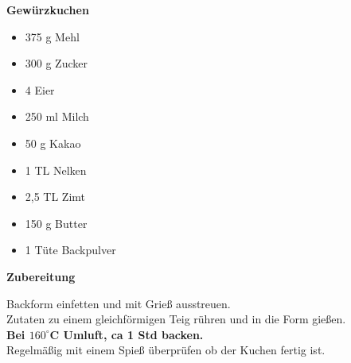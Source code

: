 
\parindent0pt	

\pagestyle{empty}


\textbf{{\LARGE Gewürzkuchen}}%


\hrulefill
\vspace*{\fill}
\begin{multicols}{2}	


\begin{itemize}
\item 375 g Mehl
\item 300 g Zucker
\item 4 Eier
\item 250 ml Milch
\item 50 g Kakao
\item 1 TL Nelken
\item 2,5 TL Zimt
\item 150 g Butter
\item 1 Tüte Backpulver
\end{itemize}

\end{multicols}
\vfill
\newpage
\textbf{{\LARGE Zubereitung}}%

\hrulefill

\vspace*{\fill}
\begin{multicols}{2}


Backform einfetten und mit Grieß ausstreuen.\\
Zutaten zu einem gleichförmigen Teig rühren und in die Form gießen.\\

\textbf{Bei $160^\circ$C Umluft, ca 1 Std backen.}\\
Regelmäßig mit einem Spieß überprüfen ob der Kuchen fertig ist.




\end{multicols}
\vfill
